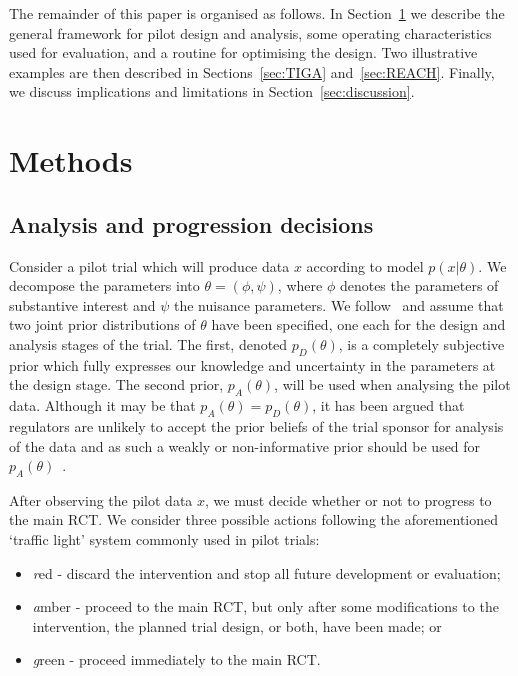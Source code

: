 \documentclass[AMA,STIX1COL]{WileyNJD-v2}
\begin{document}

The remainder of this paper is organised as follows. In Section~\ref{sec:methods} we describe the general framework for pilot design and analysis, some operating characteristics used for evaluation, and a routine for optimising the design. Two illustrative examples are then described in Sections~\ref{sec:TIGA} and~\ref{sec:REACH}. Finally, we discuss implications and limitations in Section~\ref{sec:discussion}.

\section{Methods}\label{sec:methods}

\subsection{Analysis and progression decisions}\label{sec:analysis}

Consider a pilot trial which will produce data $x$ according to model $p(x | \theta)$. We decompose the parameters into $\theta = (\phi, \psi)$, where $\phi$ denotes the parameters of substantive interest and $\psi$ the nuisance parameters. We follow~\cite{Wang2002} and assume that two joint prior distributions of $\theta$ have been specified, one each for the design and analysis stages of the trial. The first, denoted $p_{D}(\theta)$, is a completely subjective prior which fully expresses our knowledge and uncertainty in the parameters at the design stage. The second prior, $p_A(\theta)$, will be used when analysing the pilot data. Although it may be that $p_A(\theta) = p_D(\theta)$, it has been argued that regulators are unlikely to accept the prior beliefs of the trial sponsor for analysis of the data and as such a weakly or non-informative prior should be used for $p_A(\theta)$~\cite{OHagan2005, Walley2015}.

After observing the pilot data $x$, we must decide whether or not to progress to the main RCT. We consider three possible actions following the aforementioned `traffic light' system commonly used in pilot trials: 
\begin{itemize}
\item \emph{r}ed - discard the intervention and stop all future development or evaluation; 
\item \emph{a}mber - proceed to the main RCT, but only after some modifications to the intervention, the planned trial design, or both, have been made; or
\item \emph{g}reen - proceed immediately to the main RCT.
\end{itemize}
 
\end{document}
